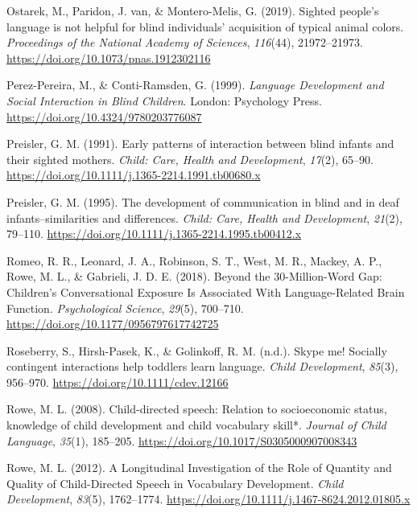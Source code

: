 \documentclass[english,man]{apa6}
\begin{document}
\leavevmode\hypertarget{ref-ostarek2019}{}%
Ostarek, M., Paridon, J. van, \& Montero-Melis, G. (2019). Sighted people's language is not helpful for blind individuals' acquisition of typical animal colors. \emph{Proceedings of the National Academy of Sciences}, \emph{116}(44), 21972--21973. \url{https://doi.org/10.1073/pnas.1912302116}

\leavevmode\hypertarget{ref-perez-pereira1999}{}%
Perez-Pereira, M., \& Conti-Ramsden, G. (1999). \emph{Language Development and Social Interaction in Blind Children}. London: Psychology Press. \url{https://doi.org/10.4324/9780203776087}

\leavevmode\hypertarget{ref-preisler1991}{}%
Preisler, G. M. (1991). Early patterns of interaction between blind infants and their sighted mothers. \emph{Child: Care, Health and Development}, \emph{17}(2), 65--90. \url{https://doi.org/10.1111/j.1365-2214.1991.tb00680.x}

\leavevmode\hypertarget{ref-preisler1995}{}%
Preisler, G. M. (1995). The development of communication in blind and in deaf infants--similarities and differences. \emph{Child: Care, Health and Development}, \emph{21}(2), 79--110. \url{https://doi.org/10.1111/j.1365-2214.1995.tb00412.x}

\leavevmode\hypertarget{ref-romeo2018}{}%
Romeo, R. R., Leonard, J. A., Robinson, S. T., West, M. R., Mackey, A. P., Rowe, M. L., \& Gabrieli, J. D. E. (2018). Beyond the 30-Million-Word Gap: Children's Conversational Exposure Is Associated With Language-Related Brain Function. \emph{Psychological Science}, \emph{29}(5), 700--710. \url{https://doi.org/10.1177/0956797617742725}

\leavevmode\hypertarget{ref-roseberry2014}{}%
Roseberry, S., Hirsh-Pasek, K., \& Golinkoff, R. M. (n.d.). Skype me! Socially contingent interactions help toddlers learn language. \emph{Child Development}, \emph{85}(3), 956--970. \url{https://doi.org/10.1111/cdev.12166}

\leavevmode\hypertarget{ref-rowe2008}{}%
Rowe, M. L. (2008). Child-directed speech: Relation to socioeconomic status, knowledge of child development and child vocabulary skill*. \emph{Journal of Child Language}, \emph{35}(1), 185--205. \url{https://doi.org/10.1017/S0305000907008343}

\leavevmode\hypertarget{ref-rowe2012}{}%
Rowe, M. L. (2012). A Longitudinal Investigation of the Role of Quantity and Quality of Child-Directed Speech in Vocabulary Development. \emph{Child Development}, \emph{83}(5), 1762--1774. \url{https://doi.org/10.1111/j.1467-8624.2012.01805.x}
\end{document}
